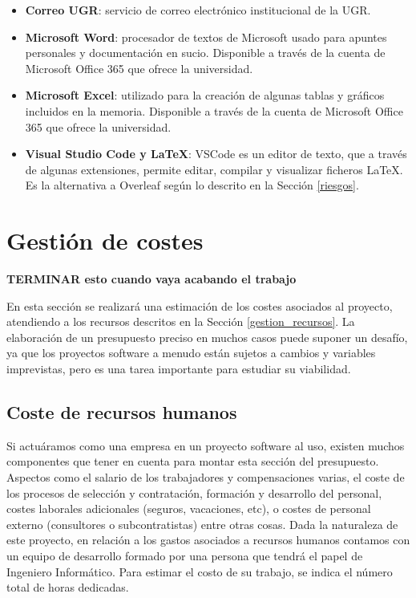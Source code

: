 \begin{itemize}
    \item \textbf{Correo UGR}: servicio de correo electrónico institucional de la UGR.

    \item \textbf{Microsoft Word}: procesador de textos de Microsoft usado para apuntes personales y documentación en sucio. Disponible a través de la cuenta de Microsoft Office 365 que ofrece la universidad.

    \item \textbf{Microsoft Excel}: utilizado para la creación de algunas tablas y gráficos incluidos en la memoria. Disponible a través de la cuenta de Microsoft Office 365 que ofrece la universidad.

    \item \textbf{Visual Studio Code y LaTeX}: VSCode es un editor de texto, que a través de algunas extensiones, permite editar, compilar y visualizar ficheros LaTeX. Es la alternativa a Overleaf según lo descrito en la Sección \ref{riesgos}. 

    
    
\end{itemize}

\section{Gestión de costes}
\textbf{TERMINAR esto cuando vaya acabando el trabajo}

En esta sección se realizará una estimación de los costes asociados al proyecto, atendiendo a los recursos descritos en la Sección \ref{gestion_recursos}. La elaboración de un presupuesto preciso en muchos casos puede suponer un desafío, ya que los proyectos software a menudo están sujetos a cambios y variables imprevistas, pero es una tarea importante para estudiar su viabilidad. 

\subsection{Coste de recursos humanos}
Si actuáramos como una empresa en un proyecto software al uso, existen muchos componentes que tener en cuenta para montar esta sección del presupuesto. Aspectos como el salario de los trabajadores y compensaciones varias, el coste de los procesos de selección y contratación, formación y desarrollo del personal, costes laborales adicionales (seguros, vacaciones, etc), o costes de personal externo (consultores o subcontratistas) entre otras cosas.
Dada la naturaleza de este proyecto, en relación a los gastos asociados a recursos humanos contamos con un equipo de desarrollo formado por una persona que tendrá el papel de Ingeniero Informático. Para estimar el costo de su trabajo, se indica el número total de horas dedicadas.

